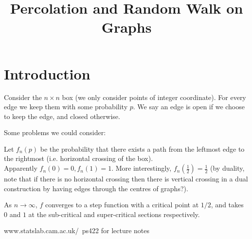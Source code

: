 \documentclass[a4paper]{article}
\begin{document}
\title{Percolation and Random Walk on Graphs}

\maketitle

\newpage

\tableofcontents

\newpage

\section{Introduction}

Consider the $n\times n$ box (we only consider points of integer coordinate). For every edge we keep them with some probability $p$. We say an edge is open if we choose to keep the edge, and closed otherwise.

Some problems we could consider:

\begin{eg}
Let $f_n(p)$ be the probability that there exists a path from the leftmost edge to the rightmost (i.e. horizontal crossing of the box).\\
Apparently $f_n(0)=0,f_n(1)=1$. More interestingly, $f_n(\frac{1}{2})=\frac{1}{2}$ (by duality, note that if there is no horizontal crossing then there is vertical crossing in a dual construction by having edges through the centres of graphs?).

As $n\to\infty$, $f$ converges to a step function with a critical point at $1/2$, and takes $0$ and $1$ at the sub-critical and super-critical sections respectively.

www.statslab.cam.ac.uk/~ps422 for lecture notes
\end{eg}
\end{document}
